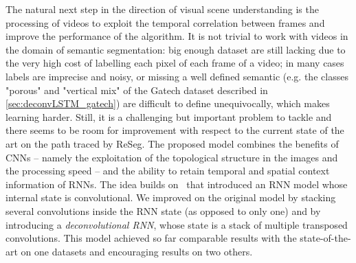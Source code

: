 The natural next step in the direction of visual scene understanding is the
processing of videos to exploit the temporal correlation between frames and
improve the performance of the algorithm. It is not trivial to work with videos
in the domain of semantic segmentation: big enough dataset are still lacking
due to the very high cost of labelling each pixel of each frame of a video; in
many cases labels are imprecise and noisy, or missing a well defined semantic
(e.g. the classes "porous" and "vertical mix" of the Gatech dataset described
in \autoref{sec:deconvLSTM_gatech}) are difficult to define unequivocally,
which makes learning harder. Still, it is a challenging but important problem
to tackle and there seems to be room for improvement with respect to the
current state of the art on the path traced by ReSeg. The proposed model
combines the benefits of CNNs -- namely the exploitation of the topological
structure in the images and the processing speed -- and the ability to retain
temporal and spatial context information of RNNs. The idea builds on~\cite{
    xingjian2015convolutional} that introduced an RNN model whose internal
state is convolutional. We improved on the original model by stacking several
convolutions inside the RNN state (as opposed to only one) and by introducing a
\emph{deconvolutional RNN}, whose state is a stack of multiple transposed
convolutions. This model achieved so far comparable results with the
state-of-the-art on one datasets and encouraging results on two others.


